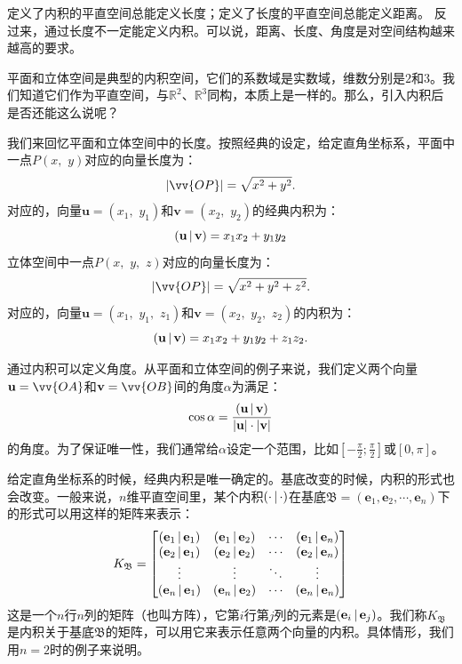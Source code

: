 \documentclass[12pt,UTF8]{ctexbook}
\begin{document}
定义了内积的平直空间总能定义长度；定义了长度的平直空间总能定义距离。
反过来，通过长度不一定能定义内积。可以说，距离、长度、角度是对空间结构越来越高的要求。

平面和立体空间是典型的内积空间，它们的系数域是实数域，维数分别是$2$和$3$。我们知道它们作为平直空间，与$\mathbb{R}^2$、$\mathbb{R}^3$同构，本质上是一样的。那么，引入内积后是否还能这么说呢？

我们来回忆平面和立体空间中的长度。按照经典的设定，给定直角坐标系，平面中一点$P(x, \,\,y)$对应的向量长度为：
$$ | \vv{OP} | = \sqrt{x^2 + y^2}.$$
对应的，向量$\mathbf{u} = (x_1, \,\,y_1)$和$\mathbf{v} = (x_2, \,\,y_2)$的经典内积为：
$$ \displaystyle\left( \mathbf{u} \,|\, \mathbf{v} \right) = x_1x_2 + y_1y_2 $$
立体空间中一点$P(x, \,\,y, \,\,z)$对应的向量长度为：
$$ | \vv{OP} | = \sqrt{x^2 + y^2 + z^2}.$$
对应的，向量$\mathbf{u} = (x_1, \,\,y_1,\,\,z_1)$和$\mathbf{v} = (x_2, \,\,y_2,\,\,z_2)$的内积为：
$$ \displaystyle\left( \mathbf{u} \,|\, \mathbf{v} \right) = x_1x_2 + y_1y_2 + z_1z_2.$$

通过内积可以定义角度。从平面和立体空间的例子来说，我们定义两个向量$\mathbf{u} = \vv{OA}$和$\mathbf{v} = \vv{OB}$间的角度$\alpha$为满足：
$$ \cos{\alpha } = \frac{\displaystyle\left( \mathbf{u} \,|\, \mathbf{v} \right)}{|\mathbf{u}|\cdot|\mathbf{v}|}$$
的角度。为了保证唯一性，我们通常给$\alpha$设定一个范围，比如$\left[-\frac{\pi}{2};\frac{\pi}{2}\right]$或$[0,\pi]$。

给定直角坐标系的时候，经典内积是唯一确定的。基底改变的时候，内积的形式也会改变。一般来说，$n$维平直空间里，某个内积$\displaystyle\left( \cdot \,|\, \cdot \right)$在基底$\mathfrak{B} = (\mathbf{e}_1, \mathbf{e}_2, \cdots, \mathbf{e}_n)$下的形式可以用这样的矩阵来表示：
$$ K_{\mathfrak{B}} = \begin{bmatrix}
    \displaystyle\left( \mathbf{e}_1 \,|\, \mathbf{e}_1 \right) & \displaystyle\left( \mathbf{e}_1 \,|\, \mathbf{e}_2 \right) & \cdots & \displaystyle\left( \mathbf{e}_1 \,|\, \mathbf{e}_n \right) \\ \displaystyle\left( \mathbf{e}_2 \,|\, \mathbf{e}_1 \right) & \displaystyle\left( \mathbf{e}_2 \,|\, \mathbf{e}_2 \right) & \cdots & \displaystyle\left( \mathbf{e}_2 \,|\, \mathbf{e}_n \right) \\ \vdots & \vdots & \ddots & \vdots \\ \displaystyle\left( \mathbf{e}_n \,|\, \mathbf{e}_1 \right) & \displaystyle\left( \mathbf{e}_n \,|\, \mathbf{e}_2 \right) & \cdots & \displaystyle\left( \mathbf{e}_n \,|\, \mathbf{e}_n \right) 
\end{bmatrix} $$
这是一个$n$行$n$列的矩阵（也叫方阵），它第$i$行第$j$列的元素是$\displaystyle\left( \mathbf{e}_i \,|\, \mathbf{e}_j \right)$。我们称$K_{\mathfrak{B}}$是内积关于基底$\mathfrak{B}$的矩阵，可以用它来表示任意两个向量的内积。具体情形，我们用$n=2$时的例子来说明。
\end{document}
